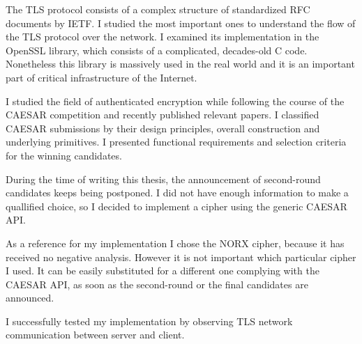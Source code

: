 \begin{conclusion}

The TLS protocol consists of a complex structure of standardized RFC documents by IETF. I studied the most important ones to understand the flow of the TLS protocol over the network. I examined its implementation in the OpenSSL library, which consists of a complicated, decades-old C code. Nonetheless this library is massively used in the real world and it is an important part of critical infrastructure of the Internet.

I studied the field of authenticated encryption while following the course of the CAESAR competition and recently published relevant papers. I classified CAESAR submissions by their design principles, overall construction and underlying primitives. I presented functional requirements and selection criteria for the winning candidates.

During the time of writing this thesis, the announcement of second-round candidates keeps being postponed. I did not have enough information to make a quallified choice, so I decided to implement a cipher using the generic CAESAR API.

As a reference for my implementation I chose the NORX cipher, because it has received no negative analysis. However it is not important which particular cipher I used. It can be easily substituted for a different one complying with the CAESAR API, as soon as the second-round or the final candidates are announced.

I successfully tested my implementation by observing TLS network communication between server and client.

\end{conclusion}
